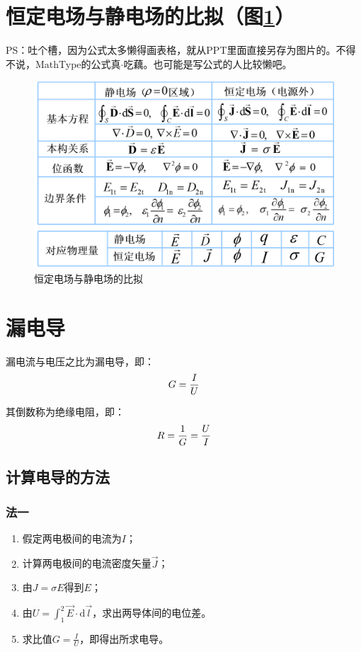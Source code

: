 \section{恒定电场与静电场的比拟（图\ref{fig:assimilation}）}
PS：吐个槽，因为公式太多懒得画表格，就从PPT里面直接另存为图片的。不得不说，MathType的公式真$\cdot$吃藕。也可能是写公式的人比较懒吧。
\begin{figure}[h]
	\centering
	\includegraphics[width=\linewidth]{pics/恒定电场与静电场的比拟}
	\caption{恒定电场与静电场的比拟}
	\label{fig:assimilation}
\end{figure}

\section{漏电导}
漏电流与电压之比为漏电导，即：
$$G = {I \over U}$$

其倒数称为绝缘电阻，即：
$$R = {1 \over G} = {U \over I}$$

\subsection*{计算电导的方法}
\subsubsection*{法一}
\begin{enumerate}
	\item 假定两电极间的电流为$I$；
	\item 计算两电极间的电流密度矢量$\vec{J}$；
	\item 由$J = \sigma E$得到$E$；
	\item 由$U = \int^2_1\vec{E}\cdot\mathrm{d}\vec{l}$，求出两导体间的电位差。
	\item 求比值$G = \frac{I}{U}$，即得出所求电导。
\end{enumerate}

